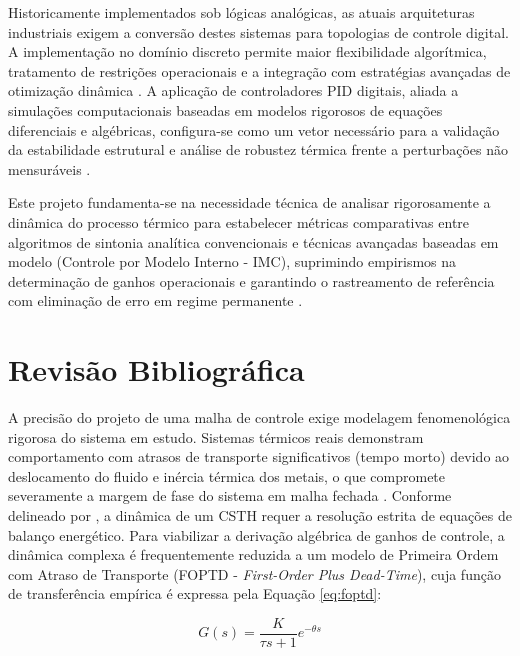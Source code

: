 \documentclass[12pt, a4paper]{article}
\begin{document}
Historicamente implementados sob lógicas analógicas, as atuais arquiteturas industriais exigem a conversão destes sistemas para topologias de controle digital. A implementação no domínio discreto permite maior flexibilidade algorítmica, tratamento de restrições operacionais e a integração com estratégias avançadas de otimização dinâmica \cite{hedengren2014}. A aplicação de controladores PID digitais, aliada a simulações computacionais baseadas em modelos rigorosos de equações diferenciais e algébricas, configura-se como um vetor necessário para a validação da estabilidade estrutural e análise de robustez térmica frente a perturbações não mensuráveis \cite{hedengren2014}.

Este projeto fundamenta-se na necessidade técnica de analisar rigorosamente a dinâmica do processo térmico para estabelecer métricas comparativas entre algoritmos de sintonia analítica convencionais e técnicas avançadas baseadas em modelo (Controle por Modelo Interno - IMC), suprimindo empirismos na determinação de ganhos operacionais e garantindo o rastreamento de referência com eliminação de erro em regime permanente \cite{stanisic2025}.

\newpage
\section{Revisão Bibliográfica}

A precisão do projeto de uma malha de controle exige modelagem fenomenológica rigorosa do sistema em estudo. Sistemas térmicos reais demonstram comportamento com atrasos de transporte significativos (tempo morto) devido ao deslocamento do fluido e inércia térmica dos metais, o que compromete severamente a margem de fase do sistema em malha fechada \cite{sen2004}. Conforme delineado por \cite{dhanasekar2024}, a dinâmica de um CSTH requer a resolução estrita de equações de balanço energético. Para viabilizar a derivação algébrica de ganhos de controle, a dinâmica complexa é frequentemente reduzida a um modelo de Primeira Ordem com Atraso de Transporte (FOPTD - \textit{First-Order Plus Dead-Time}), cuja função de transferência empírica é expressa pela Equação \ref{eq:foptd}:

\begin{equation}
    G(s) = \frac{K}{\tau s + 1} e^{-\theta s}
    \label{eq:foptd}
\end{equation}
\end{document}
